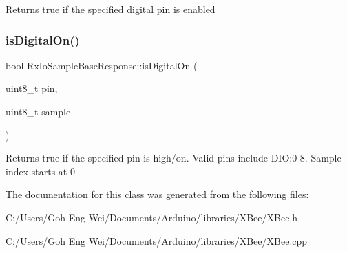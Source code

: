 Returns true if the specified digital pin is enabled \hypertarget{class_rx_io_sample_base_response_ad4ffc0eb84c685fe45618d6b73a20ce2}{}\label{class_rx_io_sample_base_response_ad4ffc0eb84c685fe45618d6b73a20ce2} 
\subsubsection{\texorpdfstring{is\+Digital\+On()}{isDigitalOn()}}
{\footnotesize\ttfamily bool Rx\+Io\+Sample\+Base\+Response\+::is\+Digital\+On (\begin{DoxyParamCaption}\item[{uint8\+\_\+t}]{pin,  }\item[{uint8\+\_\+t}]{sample }\end{DoxyParamCaption})}

Returns true if the specified pin is high/on. Valid pins include D\+IO\+:0-\/8. Sample index starts at 0 

The documentation for this class was generated from the following files\+:\begin{DoxyCompactItemize}
\item 
C\+:/\+Users/\+Goh Eng Wei/\+Documents/\+Arduino/libraries/\+X\+Bee/X\+Bee.\+h\item 
C\+:/\+Users/\+Goh Eng Wei/\+Documents/\+Arduino/libraries/\+X\+Bee/X\+Bee.\+cpp\end{DoxyCompactItemize}
